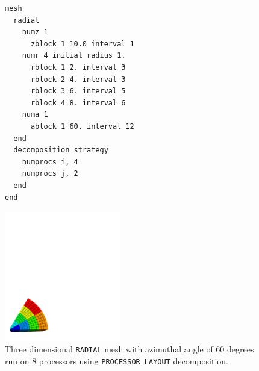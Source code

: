 \begin{figure}[htbp]
\centering
  \begin{minipage}[c]{0.4\linewidth}
    \centering
{\ttfamily \begin{verbatim}
mesh
  radial
    numz 1
      zblock 1 10.0 interval 1
    numr 4 initial radius 1.
      rblock 1 2. interval 3
      rblock 2 4. interval 3
      rblock 3 6. interval 5
      rblock 4 8. interval 6
    numa 1
      ablock 1 60. interval 12
  end
  decomposition strategy
    numprocs i, 4
    numprocs j, 2
  end
end
\end{verbatim}}
  \end{minipage}%
  \hfil
  \begin{minipage}[c]{0.6\linewidth}
    \centering
      \includegraphics[width=2.0in]{numprocs_8}
  \end{minipage}
  \caption [\texttt{PROCESSOR LAYOUT} decomposition run on 8 processors.] {Three dimensional \texttt{RADIAL} mesh with azimuthal
    angle of 60 degrees run on 8 processors using \texttt{PROCESSOR LAYOUT} decomposition.}
  \label{fig:dec_pl}
\end{figure}
